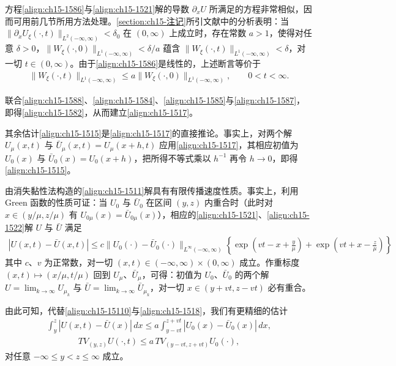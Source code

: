 \documentclass[../../main.tex]{subfiles}
\begin{document}
方程\eqref{align:ch15-1586}与\eqref{align:ch15-1521}解的导数 $\partial_xU$ 所满足的方程非常相似，因而可用前几节所用方法处理。\cref{section:ch15-注记}所引文献中的分析表明：当 $\|\partial_xU_\xi(\cdot,t)\|_{L^2(-\infty,\infty)}<\delta_0$ 在 $(0,\infty)$ 上成立时，存在常数 $a>1$，使得对任意 $\delta>0$，$\|W_\xi(\cdot,0)\|_{L^1(-\infty,\infty)}<\delta/a$ 蕴含 $\|W_\xi(\cdot,t)\|_{L^1(-\infty,\infty)}<\delta$，对一切 $t\in(0,\infty)$。由于\eqref{align:ch15-1586}是线性的，上述断言等价于
\begin{align}
\|W_\xi(\cdot,t)\|_{L^1(-\infty,\infty)}\leqslant a\|W_\xi(\cdot,0)\|_{L^1(-\infty,\infty)},\qquad0<t<\infty.
\label{align:ch15-1588}
\end{align}

联合\eqref{align:ch15-1588}、\eqref{align:ch15-1584}、\eqref{align:ch15-1585}与\eqref{align:ch15-1587}，即得\eqref{align:ch15-1582}，从而建立\eqref{align:ch15-1517}。

其余估计\eqref{align:ch15-1515}是\eqref{align:ch15-1517}的直接推论。事实上，对两个解 $U_\mu(x,t)$ 与 $\bar U_\mu(x,t)=U_\mu(x+h,t)$ 应用\eqref{align:ch15-1517}，其相应初值为 $U_0(x)$ 与 $\bar U_0(x)=U_0(x+h)$，把所得不等式乘以 $h^{-1}$ 再令 $h\to0$，即得\eqref{align:ch15-1515}。

由消失黏性法构造的\eqref{align:ch15-1511}解具有有限传播速度性质。事实上，利用 Green 函数的性质可证：当 $U_0$ 与 $\bar U_0$ 在区间 $(y,z)$ 内重合时（此时对 $x\in(y/\mu,z/\mu)$ 有 $U_{0\mu}(x)=\bar U_{0\mu}(x)$），相应的\eqref{align:ch15-1521}、\eqref{align:ch15-1522}解 $U$ 与 $\bar U$ 满足
\begin{align}
|U(x,t)-\bar U(x,t)|\leqslant c\|U_0(\cdot)-\bar U_0(\cdot)\|_{L^\infty(-\infty,\infty)}\left\{\exp\left(vt-x+\frac y\mu\right)+\exp\left(vt+x-\frac z\mu\right)\right\}
\label{align:ch15-1589}
\end{align}
其中 $c$、$v$ 为正常数，对一切 $(x,t)\in(-\infty,\infty)\times(0,\infty)$ 成立。作重标度 $(x,t)\mapsto(x/\mu,t/\mu)$ 回到 $U_\mu$、$\bar U_\mu$，可得：初值为 $U_0$、$\bar U_0$ 的两个解 $U=\lim_{k\to\infty}U_{\mu_k}$ 与 $\bar U=\lim_{k\to\infty}\bar U_{\mu_k}$，对一切 $x\in(y+vt,z-vt)$ 必有重合。

由此可知，代替\eqref{align:ch15-15110}与\eqref{align:ch15-1518}，我们有更精细的估计
\begin{align}
\int_y^z|U(x,t)-\bar U(x)|\,dx\leqslant a\int_{y-vt}^{z+vt}|U_0(x)-\bar U_0(x)|\,dx,
\label{align:ch15-15810}
\end{align}
\begin{align}
TV_{(y,z)}U(\cdot,t)\leqslant a\,TV_{(y-vt,z+vt)}U_0(\cdot),
\label{align:ch15-15811}
\end{align}
对任意 $-\infty\leqslant y<z\leqslant\infty$ 成立。
\end{document}
